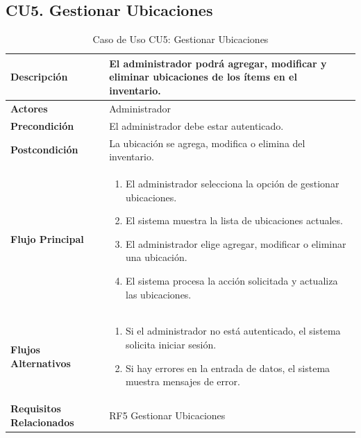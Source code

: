 \documentclass{article}
\begin{document}
\subsection{CU5. Gestionar Ubicaciones}
\begin{table}[H]
    \centering
    \begin{tabular}{|l|p{10cm}|}
        \hline
        \textbf{Descripción} & El administrador podrá agregar, modificar y eliminar ubicaciones de los ítems en el inventario. \\ \hline
        \textbf{Actores} & Administrador \\ \hline
        \textbf{Precondición} & El administrador debe estar autenticado. \\ \hline
        \textbf{Postcondición} & La ubicación se agrega, modifica o elimina del inventario. \\ \hline
        \textbf{Flujo Principal} & 
        \begin{enumerate}
            \item El administrador selecciona la opción de gestionar ubicaciones.
            \item El sistema muestra la lista de ubicaciones actuales.
            \item El administrador elige agregar, modificar o eliminar una ubicación.
            \item El sistema procesa la acción solicitada y actualiza las ubicaciones.
        \end{enumerate} \\ \hline
        \textbf{Flujos Alternativos} & 
        \begin{enumerate}
            \item Si el administrador no está autenticado, el sistema solicita iniciar sesión.
            \item Si hay errores en la entrada de datos, el sistema muestra mensajes de error.
        \end{enumerate} \\ \hline
        \textbf{Requisitos Relacionados} & RF5 Gestionar Ubicaciones \\ \hline
    \end{tabular}
    \caption{Caso de Uso CU5: Gestionar Ubicaciones}
\end{table}
\end{document}

